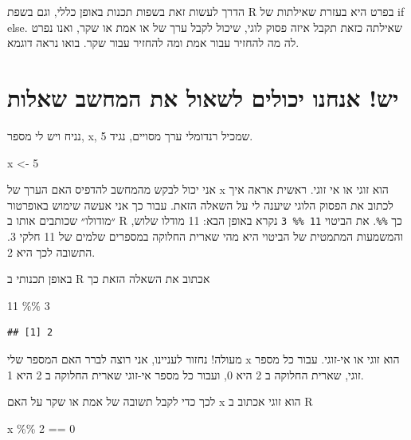 \documentclass[
]{book}
\newenvironment{Shaded}{\begin{snugshade}}{\end{snugshade}}
\newcommand{\DecValTok}[1]{\textcolor[rgb]{0.00,0.00,0.81}{#1}}
\newcommand{\NormalTok}[1]{#1}
\newcommand{\OtherTok}[1]{\textcolor[rgb]{0.56,0.35,0.01}{#1}}
\newcommand{\SpecialCharTok}[1]{\textcolor[rgb]{0.00,0.00,0.00}{#1}}
\begin{document}
הדרך לעשות זאת בשפות תכנות באופן כללי, וגם בשפת
R
בפרט היא בעזרת שאילתות של
if else.
שאילתה כזאת תקבל איזה פסוק לוגי, שיכול לקבל ערך של או אמת או שקר, ואנו נפרט לה מה להחזיר עבור אמת ומה להחזיר עבור שקר. בואו נראה דוגמא.

\hypertarget{ux5d9ux5e9-ux5d0ux5e0ux5d7ux5e0ux5d5-ux5d9ux5dbux5d5ux5dcux5d9ux5dd-ux5dcux5e9ux5d0ux5d5ux5dc-ux5d0ux5ea-ux5d4ux5deux5d7ux5e9ux5d1-ux5e9ux5d0ux5dcux5d5ux5ea}{%
\section{יש! אנחנו יכולים לשאול את המחשב שאלות}\label{ux5d9ux5e9-ux5d0ux5e0ux5d7ux5e0ux5d5-ux5d9ux5dbux5d5ux5dcux5d9ux5dd-ux5dcux5e9ux5d0ux5d5ux5dc-ux5d0ux5ea-ux5d4ux5deux5d7ux5e9ux5d1-ux5e9ux5d0ux5dcux5d5ux5ea}}

נניח ויש לי מספר,
x,
שמכיל רנדומלי ערך מסויים, נגיד 5.

\begin{Shaded}
\begin{Highlighting}[]
\NormalTok{x }\OtherTok{\textless{}{-}} \DecValTok{5}
\end{Highlighting}
\end{Shaded}

אני יכול לבקש מהמחשב להדפיס האם הערך של
x
הוא זוגי או אי זוגי. ראשית אראה איך לכתוב את הפסוק הלוגי שיענה לי על השאלה הזאת. עבור כך אני אעשה שימוש באופרטור ״מודולו״ שכותבים אותו ב
R
כך
\texttt{\%\%}.
את הביטוי
\texttt{11\ \%\%\ 3}
נקרא באופן הבא:
11 מודלו שלוש,
והמשמעות המתמטית של הביטוי היא
מהי שארית החלוקה במספרים שלמים של 11
חלקי 3.
התשובה לכך היא 2.

באופן תכנותי ב
R
אכתוב את השאלה הזאת כך

\begin{Shaded}
\begin{Highlighting}[]
\DecValTok{11} \SpecialCharTok{\%\%} \DecValTok{3}
\end{Highlighting}
\end{Shaded}

\begin{verbatim}
## [1] 2
\end{verbatim}

מעולה!
נחזור לעניינו, אני רוצה לברר האם המספר שלי
x
הוא זוגי או אי-זוגי.
עבור כל מספר זוגי, שארית החלוקה ב 2 היא 0,
ועבור כל מספר אי-זוגי שארית החלוקה ב 2 היא 1.

לכך כדי לקבל תשובה של אמת או שקר על האם
x
הוא זוגי אכתוב ב
R

\begin{Shaded}
\begin{Highlighting}[]
\NormalTok{x }\SpecialCharTok{\%\%} \DecValTok{2} \SpecialCharTok{==} \DecValTok{0}
\end{Highlighting}
\end{Shaded}
\end{document}
